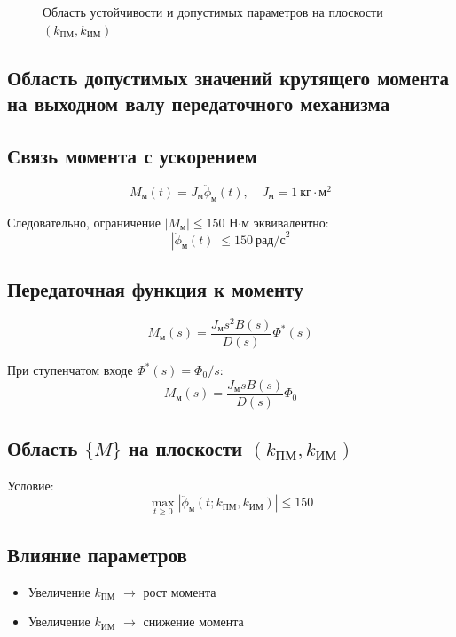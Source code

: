 \documentclass[14pt]{extreport}
\begin{document}
{\begin{figure}[H]
\caption{Область устойчивости и допустимых параметров на плоскости $(k_{\text{ПМ}}, k_{\text{ИМ}})$}
\end{figure}

        \subsection{Область допустимых значений крутящего момента на выходном валу передаточного механизма}
        \subsection*{Связь момента с ускорением}
\[
M_{\text{м}}(t) = J_{\text{м}} \ddot{\phi}_{\text{м}}(t), \quad J_{\text{м}} = 1\ \text{кг}\cdot\text{м}^2
\]

Следовательно, ограничение $|M_{\text{м}}| \leq 150$ Н$\cdot$м эквивалентно:
\[
|\ddot{\phi}_{\text{м}}(t)| \leq 150\ \text{рад/с}^2
\]

\subsection*{Передаточная функция к моменту}
\[
M_{\text{м}}(s) = \frac{J_{\text{м}} s^2 B(s)}{D(s)} \Phi^*(s)
\]

При ступенчатом входе $\Phi^*(s) = \Phi_0/s$:
\[
M_{\text{м}}(s) = \frac{J_{\text{м}} s B(s)}{D(s)} \Phi_0
\]

\subsection*{Область $\{M\}$ на плоскости $(k_{\text{ПМ}}, k_{\text{ИМ}})$}
Условие:
\[
\max_{t \geq 0} |\ddot{\phi}_{\text{м}}(t; k_{\text{ПМ}}, k_{\text{ИМ}})| \leq 150
\]

\subsection*{Влияние параметров}
\begin{itemize}
    \item Увеличение $k_{\text{ПМ}}$ $\rightarrow$ рост момента
    \item Увеличение $k_{\text{ИМ}}$ $\rightarrow$ снижение момента
\end{itemize}

}
\end{document}

